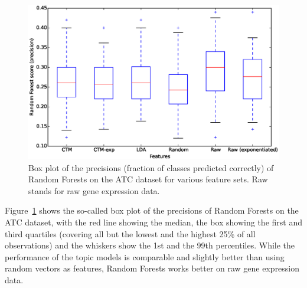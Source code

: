 \documentclass[12pt,a4paper,twoside,openright]{report}
\begin{document}

\begin{figure}[!htb]
\includegraphics[width=\textwidth]{atc-boxplot.eps}
\caption{Box plot of the precisions (fraction of classes predicted correctly) of Random Forests on the ATC dataset for various feature sets. Raw stands for raw gene expression data.}
\label{fig:atc-boxplot}
\end{figure}

Figure~\ref{fig:atc-boxplot} shows the so-called box plot of the precisions of Random Forests on the ATC dataset, with the red line showing the median, the box showing the first and third quartiles (covering all but the lowest and the highest 25\% of all observations) and the whiskers show the 1st and the 99th percentiles. While the performance of the topic models is comparable and slightly better than using random vectors as features, Random Forests works better on raw gene expression data.
\end{document}

